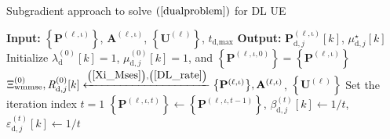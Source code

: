 \documentclass[10pt,journal]{IEEEtran}
\newcommand{\paren}[1]{\left({#1}\right)}
\newcommand{\bracket}[1]{{\left [{#1}\right ]}}
\newcommand{\braces}[1]{{\left\{ {#1}\right\}}}
\newcommand{\sfrac}[2]{#1/#2}
\theoremstyle{definition}
\begin{document}
		\begin{algorithm}[ht!]
			\par\noindent\small
			\caption{Subgradient approach to solve $\paren{\ref{dualproblem}}$ for DL UE}
			\label{DLalgorithm}
			\begin{algorithmic}[1]
				\Statex \textbf{Input: } $\braces{\mathbf{P}^{\paren{\mathrm{\ell,\iota}}}}$,  $\mathbf{A}^{\paren{\mathrm{\ell,\iota}}}$, $\braces{\mathbf{U}^{\paren{\mathrm{\ell}}}}$, $t_{\textrm{d,max}}$
				\Statex \textbf{Output:} $\mathbf{P}^{\paren{\mathrm{\ell,\iota}}}_{\textrm{d},j}\bracket{k}$, $\mu^\star_{\textrm{d},j}\bracket{k}$
				\State Initialize $\lambda^{\paren{\mathrm{0}}}_{\textrm{d}}\bracket{k}=1$, $\mu^{\paren{\mathrm{0}}}_{\textrm{d},j}\bracket{k}=1$, and $\braces{\mathbf{P}^{\paren{\ell,\iota,0}}}=\braces{\mathbf{P}^{\paren{\mathrm{\ell,\iota}}}}$ 
				\State $\Xi^{\paren{\mathrm{0}}}_{\textrm{wmmse}},\mathit{R}^{\paren{\mathrm{0}}}_{\textrm{d},j}\bracket{k}\xleftarrow{\paren{\mathrm{\ref{Xi_Mses}}},\paren{\mathrm{\ref{DL_rate}}}}\braces{\mathbf{P}^{\paren{\mathrm{\ell,\iota}}}},\mathbf{A}^{\paren{\mathrm{\ell,\iota}}}$, $\braces{\mathbf{U}^{\paren{\mathrm{\ell}}}}$
				\State Set the iteration index $t=1$
				\Repeat
				\State $\braces{\mathbf{P}^{\paren{\ell,\iota,t}}}\leftarrow\braces{\mathbf{P}^{\paren{\ell,\iota,t-1}}}$, $\beta^{\paren{t}}_{\textrm{d},j}\bracket{k}\leftarrow\sfrac{1}{t}$, $\varepsilon^{\paren{t}}_{\textrm{d},j}\bracket{k}\leftarrow\sfrac{1}{t}$

\end{algorithmic}
\end{algorithm}
\end{document}
